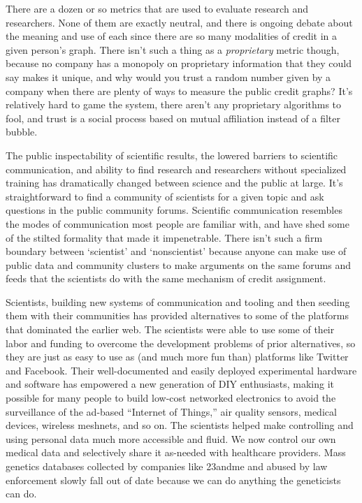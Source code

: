 \documentclass[10pt]{article}
\begin{document}
\begin{multicols}{2}
There are a dozen or so metrics that are used to evaluate research and
researchers. None of them are exactly neutral, and there is ongoing
debate about the meaning and use of each since there are so many
modalities of credit in a given person's graph. There isn't such a thing
as a \emph{proprietary} metric though, because no company has a monopoly
on proprietary information that they could say makes it unique, and why
would you trust a random number given by a company when there are plenty
of ways to measure the public credit graphs? It's relatively hard to
game the system, there aren't any proprietary algorithms to fool, and
trust is a social process based on mutual affiliation instead of a
filter bubble.

The public inspectability of scientific results, the lowered barriers to
scientific communication, and ability to find research and researchers
without specialized training has dramatically changed between science
and the public at large. It's straightforward to find a community of
scientists for a given topic and ask questions in the public community
forums. Scientific communication resembles the modes of communication
most people are familiar with, and have shed some of the stilted
formality that made it impenetrable. There isn't such a firm boundary
between `scientist' and `nonscientist' because anyone can make use of
public data and community clusters to make arguments on the same forums
and feeds that the scientists do with the same mechanism of credit
assignment.

Scientists, building new systems of communication and tooling and then
seeding them with their communities has provided alternatives to some of
the platforms that dominated the earlier web. The scientists were able
to use some of their labor and funding to overcome the development
problems of prior alternatives, so they are just as easy to use as (and
much more fun than) platforms like Twitter and Facebook. Their
well-documented and easily deployed experimental hardware and software
has empowered a new generation of DIY enthusiasts, making it possible
for many people to build low-cost networked electronics to avoid the
surveillance of the ad-based ``Internet of Things,'' air quality
sensors, medical devices, wireless meshnets, and so on. The scientists
helped make controlling and using personal data much more accessible and
fluid. We now control our own medical data and selectively share it
as-needed with healthcare providers. Mass genetics databases collected
by companies like 23andme and abused by law enforcement slowly fall out
of date because we can do anything the geneticists can do.


\end{multicols}
\end{document}
